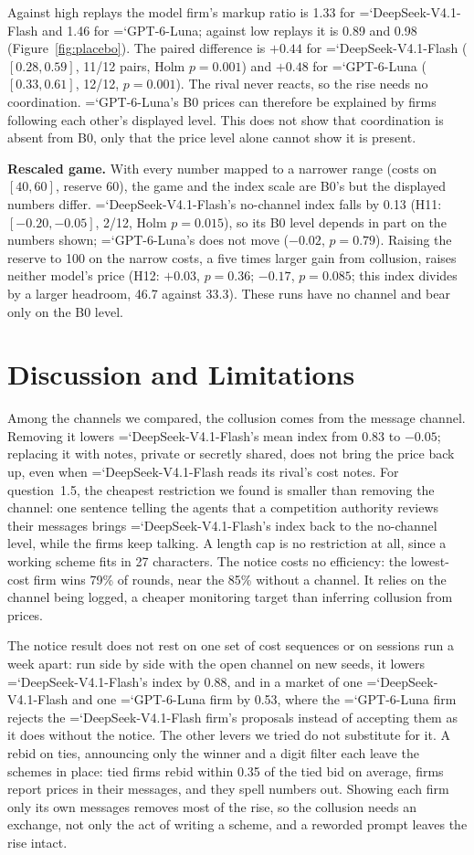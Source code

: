 \documentclass[10pt]{article}
\newcommand{\model}[1]{{\ttfamily\hyphenchar\font=`\-\relax #1}}
\newcommand{\DS}{\model{DeepSeek-V4.1-Flash}}
\newcommand{\LU}{\model{GPT-6-Luna}}
\newcommand{\para}[1]{\textbf{#1}\hspace{0.4em}}
\begin{document}
Against high replays the model firm's markup ratio is 1.33 for \DS{} and 1.46 for \LU; against low replays it is 0.89 and 0.98 (Figure~\ref{fig:placebo}). The paired difference is $+0.44$ for \DS{} ($[0.28, 0.59]$, 11/12 pairs, Holm $p = 0.001$) and $+0.48$ for \LU{} ($[0.33, 0.61]$, 12/12, $p = 0.001$). The rival never reacts, so the rise needs no coordination. \LU's B0 prices can therefore be explained by firms following each other's displayed level. This does not show that coordination is absent from B0, only that the price level alone cannot show it is present.

\para{Rescaled game.} With every number mapped to a narrower range (costs on $[40, 60]$, reserve 60), the game and the index scale are B0's but the displayed numbers differ. \DS's no-channel index falls by 0.13 (H11: $[-0.20, -0.05]$, 2/12, Holm $p = 0.015$), so its B0 level depends in part on the numbers shown; \LU's does not move ($-0.02$, $p = 0.79$). Raising the reserve to 100 on the narrow costs, a five times larger gain from collusion, raises neither model's price (H12: $+0.03$, $p = 0.36$; $-0.17$, $p = 0.085$; this index divides by a larger headroom, 46.7 against 33.3). These runs have no channel and bear only on the B0 level.

\section{Discussion and Limitations}

Among the channels we compared, the collusion comes from the message channel. Removing it lowers \DS's mean index from 0.83 to $-0.05$; replacing it with notes, private or secretly shared, does not bring the price back up, even when \DS{} reads its rival's cost notes. For question~1.5, the cheapest restriction we found is smaller than removing the channel: one sentence telling the agents that a competition authority reviews their messages brings \DS's index back to the no-channel level, while the firms keep talking. A length cap is no restriction at all, since a working scheme fits in 27 characters. The notice costs no efficiency: the lowest-cost firm wins 79\% of rounds, near the 85\% without a channel. It relies on the channel being logged, a cheaper monitoring target than inferring collusion from prices.

The notice result does not rest on one set of cost sequences or on sessions run a week apart: run side by side with the open channel on new seeds, it lowers \DS's index by 0.88, and in a market of one \DS{} and one \LU{} firm by 0.53, where the \LU{} firm rejects the \DS{} firm's proposals instead of accepting them as it does without the notice. The other levers we tried do not substitute for it. A rebid on ties, announcing only the winner and a digit filter each leave the schemes in place: tied firms rebid within 0.35 of the tied bid on average, firms report prices in their messages, and they spell numbers out. Showing each firm only its own messages removes most of the rise, so the collusion needs an exchange, not only the act of writing a scheme, and a reworded prompt leaves the rise intact.
\end{document}
